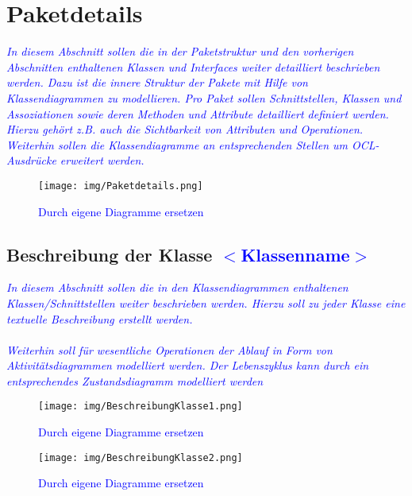 \section{Paketdetails}
\textcolor{blue}{\textit{In diesem Abschnitt sollen die in der Paketstruktur und den vorherigen Abschnitten enthaltenen Klassen und Interfaces weiter detailliert beschrieben werden. Dazu ist die innere Struktur der Pakete mit Hilfe von Klassendiagrammen zu modellieren. Pro Paket sollen Schnittstellen, Klassen und Assoziationen sowie deren Methoden und Attribute detailliert definiert werden. Hierzu gehört z.B. auch die Sichtbarkeit von Attributen und Operationen. Weiterhin sollen die Klassendiagramme an entsprechenden Stellen um OCL-Ausdrücke erweitert werden.
}}

\begin{figure}[H]
\centering
\texttt{[image: img/Paketdetails.png]}
\caption{\textcolor{blue}{Durch eigene Diagramme ersetzen}}
\label{Paketdetails}
\end{figure}
\subsection{Beschreibung der Klasse \textcolor{blue}{$<$Klassenname$>$}}
\textcolor{blue}{\textit{In diesem Abschnitt sollen die in den Klassendiagrammen enthaltenen Klassen/Schnittstellen weiter beschrieben werden. Hierzu soll zu jeder Klasse eine textuelle Beschreibung erstellt werden.\\\\
Weiterhin soll für wesentliche Operationen der Ablauf in Form von Aktivitätsdiagrammen modelliert werden. Der Lebenszyklus kann durch ein entsprechendes Zustandsdiagramm modelliert werden
}}

\begin{figure}[H]
\centering
\texttt{[image: img/BeschreibungKlasse1.png]}
\caption{\textcolor{blue}{Durch eigene Diagramme ersetzen}}
\label{BeschreibungKlasse1}
\end{figure}

\begin{figure}[H]
\centering
\texttt{[image: img/BeschreibungKlasse2.png]}
\caption{\textcolor{blue}{Durch eigene Diagramme ersetzen}}
\label{BeschreibungKlasse2}
\end{figure}
